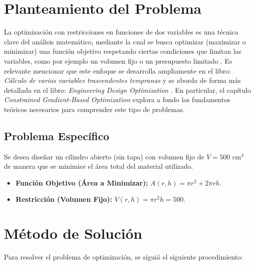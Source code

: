 \documentclass[12pt]{article}  %
\begin{document}
\section{Planteamiento del Problema}

La optimización con restricciones en funciones de dos variables es una técnica clave del análisis matemático, mediante la cual se busca optimizar (maximizar o minimizar) una función objetivo respetando ciertas condiciones que limitan las variables, como por ejemplo un volumen fijo o un presupuesto limitado \cite{IBM}.
Es relevante mencionar que este enfoque se desarrolla ampliamente en el libro: \textit{Cálculo de varias variables trascendentes tempranas}\cite{Stewart} y se aborda de forma más detallada en el libro: \textit{Engineering Design Optimization} \cite{Martins}. En particular, el capítulo \textit{Constrained Gradient-Based Optimization} explora a fondo los fundamentos teóricos necesarios para comprender este tipo de problemas.

\subsection*{Problema Específico}
Se desea diseñar un cilindro abierto (sin tapa) con volumen fijo de $V=500\text{ cm}^{3}$ de manera que se minimice el área total del material utilizado.

\begin{itemize}
 \item \textbf{Función Objetivo (Área a Minimizar):} $A(r,h)=\pi r^{2}+2\pi rh$.
 \item \textbf{Restricción (Volumen Fijo):} $V(r,h)=\pi r^{2}h = 500$.
\end{itemize}

\section{Método de Solución}

Para resolver el problema de optimización, se siguió el siguiente procedimiento:
\end{document}
